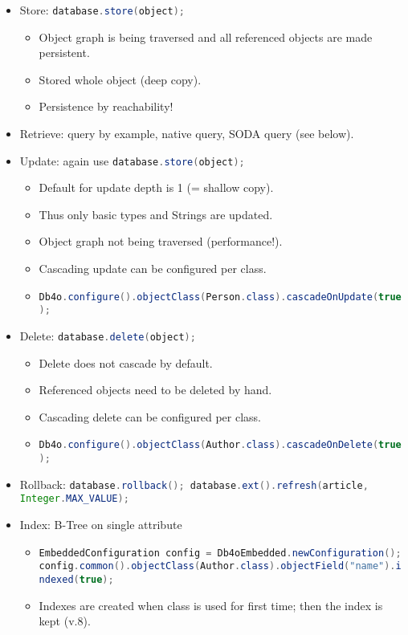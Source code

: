 \begin{breakbox}
\end{breakbox}

\begin{breakbox}
\begin{itemize}
	\item Store: \lstinline[language=Java]{database.store(object);}
		\begin{itemize}
			\item Object graph is being traversed and all referenced objects are made persistent.
			\item Stored whole object (deep copy).
			\item Persistence by reachability!
		\end{itemize}
	\item Retrieve: query by example, native query, SODA query (see below).
	\item Update: again use \lstinline[language=Java]{database.store(object);}
		\begin{itemize}
			\item Default for update depth is 1 (= shallow copy).
			\item Thus only basic types and Strings are updated.
			\item Object graph not being traversed (performance!).
			\item Cascading update can be configured per class.
			\item \lstinline[language=Java]{Db4o.configure().objectClass(Person.class).cascadeOnUpdate(true);}
		\end{itemize}
	\item Delete: \lstinline[language=Java]{database.delete(object);}
		\begin{itemize}
			\item Delete does not cascade by default.
			\item Referenced objects need to be deleted by hand.
			\item Cascading delete can be configured per class.
			\item \lstinline[language=Java]{Db4o.configure().objectClass(Author.class).cascadeOnDelete(true);}
		\end{itemize}
	\item Rollback: \lstinline[language=Java]{database.rollback(); database.ext().refresh(article, Integer.MAX_VALUE);}
	\item Index: B-Tree on single attribute
		\begin{itemize}
			\item \lstinline[language=Java]{EmbeddedConfiguration config = Db4oEmbedded.newConfiguration(); config.common().objectClass(Author.class).objectField("name").indexed(true);}
			\item Indexes are created when class is used for first time; then the index is kept (v.8).
		\end{itemize}
\end{itemize}
\end{breakbox}

